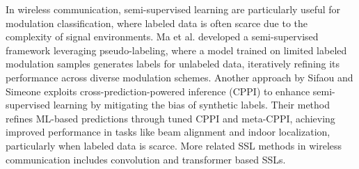 In wireless communication, semi-supervised learning are particularly useful for modulation classification, where labeled data is often scarce due to the complexity of signal environments. Ma et al. \cite{ma2024refined} developed a semi-supervised framework leveraging pseudo-labeling, where a model trained on limited labeled modulation samples generates labels for unlabeled data, iteratively refining its performance across diverse modulation schemes. Another approach by Sifaou and Simeone \cite{sifaou2024semisupervisedlearningcrosspredictionpoweredinference} exploits cross-prediction-powered inference (CPPI) to enhance semi-supervised learning by mitigating the bias of synthetic labels. Their method refines ML-based predictions through tuned CPPI and meta-CPPI, achieving improved performance in tasks like beam alignment and indoor localization, particularly when labeled data is scarce. More related SSL methods in wireless communication includes convolution \cite{zhang2024sswsrnetsemisupervisedfewshotlearning, ermis2022cnn, pmlr-v77-longi17a} and transformer \cite{kong2023transformer, ren2022sigtefficientendtoendmimoofdm, kunde2023transformers} based SSLs.


